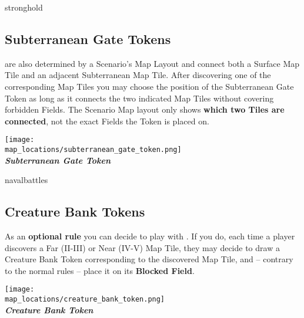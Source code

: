 \begin{multicols}{2}
\begin{expansion}[before=\vspace*{-11mm}]{stronghold}
  \subsection*{Subterranean Gate Tokens}
   are also determined by a Scenario's Map Layout and connect both a Surface Map Tile and an adjacent Subterranean Map Tile.
  After discovering one of the corresponding Map Tiles you may choose the position of the Subterranean Gate Token as long as it connects the two indicated Map Tiles without covering forbidden Fields.
  The Scenario Map layout only shows \textbf{which two Tiles are connected}, not the exact Fields the Token is placed on.
  \bigskip
  \begin{center}
    \texttt{[image: \\map\_locations/subterranean\_gate\_token.png]}\\
    \footnotesize{\textbf{\textit{\textcolor{darkcandyapplered}{Subterranean Gate Token}}}}
  \end{center}
\end{expansion}

\bigskip

\begin{expansion}[before=\vspace*{0pt}]{navalbattles}
  \subsection*{Creature Bank Tokens}
  As an \textbf{optional rule} you can decide to play with .
  If you do, each time a player discovers a Far \mbox{(II-III)} or Near \mbox{(IV-V)} Map Tile, they may decide to draw a Creature Bank Token corresponding to the discovered Map Tile, and -- contrary to the normal rules -- place it on its \textbf{Blocked Field}.
  \bigskip
  \begin{center}
    \texttt{[image: \\map\_locations/creature\_bank\_token.png]}\\
    \footnotesize{\textbf{\textit{\textcolor{darkcandyapplered}{Creature Bank Token}}}}
  \end{center}
\end{expansion}
\end{multicols}
